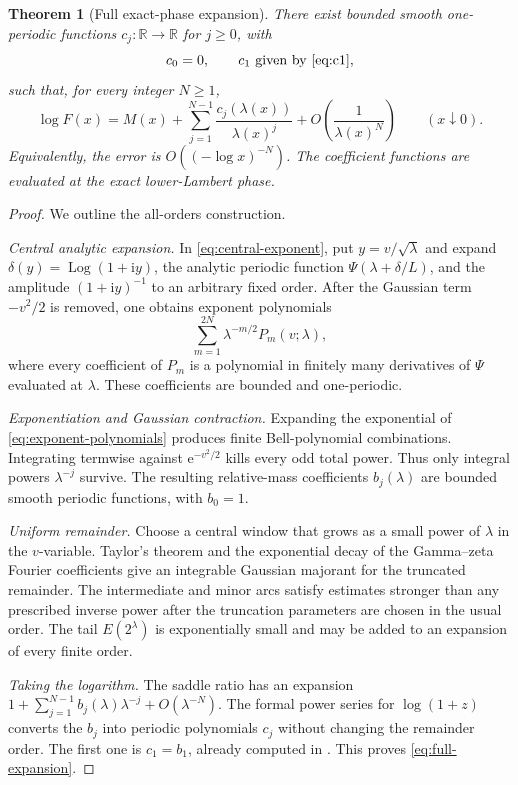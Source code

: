 \documentclass[11pt]{article}
\numberwithin{equation}{section}
\newtheorem{theorem}{Theorem}[section]
\theoremstyle{definition}
\theoremstyle{remark}
\DeclareMathOperator{\Log}{Log}
\newcommand{\R}{\mathbb{R}}
\newcommand{\e}{\mathrm{e}}
\newcommand{\ii}{\mathrm{i}}
\begin{document}
\begin{theorem}[Full exact-phase expansion]\label{thm:full-expansion}
There exist bounded smooth one-periodic functions
$c_j:\R\to\R$ for $j\ge0$, with
\begin{equation}\label{eq:c0-zero}
 c_0=0,
 \qquad c_1\text{ given by \eqref{eq:c1}},
\end{equation}
such that, for every integer $N\ge1$,
\begin{equation}\label{eq:full-expansion}
 \log F(x)=M(x)+
 \sum_{j=1}^{N-1}\frac{c_j(\lambda(x))}{\lambda(x)^j}
 +O\left(\frac1{\lambda(x)^N}\right)
 \qquad(x\downarrow0).
\end{equation}
Equivalently, the error is
$O(({-\log x})^{-N})$.  The coefficient functions are evaluated at the exact
lower-Lambert phase.
\end{theorem}

\begin{proof}
We outline the all-orders construction.

\emph{Central analytic expansion.}
In \eqref{eq:central-exponent}, put $y=v/\sqrt\lambda$ and expand
$\delta(y)=\Log(1+\ii y)$, the analytic periodic function
$\Psi(\lambda+\delta/L)$, and the amplitude $(1+\ii y)^{-1}$ to an arbitrary
fixed order.  After the Gaussian term $-v^2/2$ is removed, one obtains
exponent polynomials
\begin{equation}\label{eq:exponent-polynomials}
 \sum_{m=1}^{2N}\lambda^{-m/2}P_m(v;\lambda),
\end{equation}
where every coefficient of $P_m$ is a polynomial in finitely many derivatives
of $\Psi$ evaluated at $\lambda$.  These coefficients are bounded and
one-periodic.

\emph{Exponentiation and Gaussian contraction.}
Expanding the exponential of \eqref{eq:exponent-polynomials} produces finite
Bell-polynomial combinations.  Integrating termwise against
$\e^{-v^2/2}$ kills every odd total power.  Thus only integral powers
$\lambda^{-j}$ survive.  The resulting relative-mass coefficients
$b_j(\lambda)$ are bounded smooth periodic functions, with $b_0=1$.

\emph{Uniform remainder.}
Choose a central window that grows as a small power of $\lambda$ in the
$v$-variable.  Taylor's theorem and the exponential decay of the Gamma--zeta
Fourier coefficients give an integrable Gaussian majorant for the truncated
remainder.  The intermediate and minor arcs satisfy estimates stronger than
any prescribed inverse power after the truncation parameters are chosen in
the usual order.  The tail $E(2^\lambda)$ is exponentially small and may be
added to an expansion of every finite order.

\emph{Taking the logarithm.}
The saddle ratio has an expansion
$1+\sum_{j=1}^{N-1}b_j(\lambda)\lambda^{-j}+O(\lambda^{-N})$.
The formal power series for $\log(1+z)$ converts the $b_j$ into periodic
polynomials $c_j$ without changing the remainder order.  The first one is
$c_1=b_1$, already computed in .  This proves
\eqref{eq:full-expansion}.
\end{proof}
\end{document}
